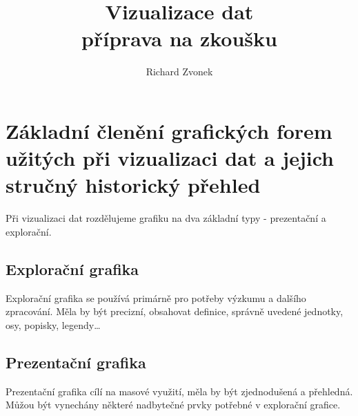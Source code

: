 \documentclass[10pt,a4paper, table]{article}
\title{Vizualizace dat \\ příprava na zkoušku}
\author{Richard Zvonek}
\begin{document}
\maketitle
\tableofcontents

\newpage

\section{Základní členění grafických forem užitých při vizualizaci dat a jejich stručný historický přehled}
Při vizualizaci dat rozdělujeme grafiku na dva základní typy - prezentační a explorační.
\subsection{Explorační grafika}
Explorační grafika se používá primárně pro potřeby výzkumu a dalšího zpracování. Měla by být precizní, obsahovat definice, správně uvedené jednotky, osy, popisky, legendy\dots

\subsection{Prezentační grafika}
Prezentační grafika cílí na masové využití, měla by být zjednodušená a přehledná. Můžou být vynechány některé nadbytečné prvky potřebné v explorační grafice.
\end{document}
